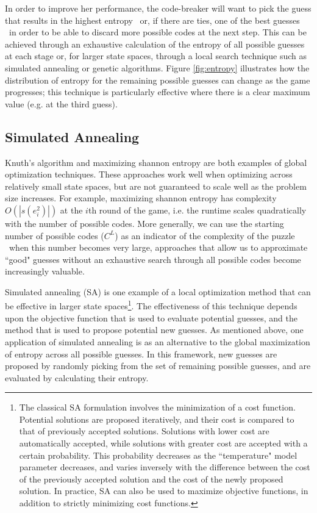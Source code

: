 \documentclass[11pt]{article}
\begin{document}
In order to improve her performance, the code-breaker will want to pick the guess that results in the highest entropy \textendash \ or, if there are ties, one of the best guesses \textendash \ in order to be able to discard more possible codes at the next step. This can be achieved through an exhaustive calculation of the entropy of all possible guesses at each stage or, for larger state spaces, through a local search technique such as simulated annealing or genetic algorithms.  Figure \ref{fig:entropy} illustrates how the distribution of entropy for the remaining possible guesses can change as the game progresses; this technique is particularly effective where there is a clear maximum value (e.g. at the third guess).

\subsection{Simulated Annealing}

Knuth's algorithm and maximizing shannon entropy are both examples of global optimization techniques. These approaches work well when optimizing across relatively small state spaces, but  are not guaranteed to scale well as the problem size increases. For example, maximizing shannon entropy has complexity $O(|s(e_i^2)|)$ at the $i$th round of the game, i.e. the runtime scales quadratically with the number of possible codes. More generally, we can use the starting number of possible codes ($C^L$) as an indicator of the complexity of the puzzle \textendash \ when this number becomes very large, approaches that allow us to approximate ``good" guesses without an exhaustive search through all possible codes become increasingly valuable.

Simulated annealing (SA) is one example of a local optimization method that can be effective in larger state spaces\footnote{The classical SA formulation involves the minimization of a cost function. Potential solutions are proposed iteratively, and their cost is compared to that of previously accepted solutions. Solutions with lower cost are automatically accepted, while solutions with greater cost are accepted with a certain probability. This probability decreases as the ``temperature" model parameter decreases, and varies inversely with the difference between the cost of the previously accepted solution and the cost of the newly proposed solution. In practice, SA can also be used to maximize objective functions, in addition to strictly minimizing cost functions.}. The effectiveness of this technique depends upon the objective function that is used to evaluate potential guesses, and the method that is used to propose potential new guesses. As mentioned above, one application of simulated annealing is as an alternative to the global maximization of entropy across all possible guesses. In this framework, new guesses are proposed by randomly picking from the set of remaining possible guesses, and are evaluated by calculating their entropy.
\end{document}
